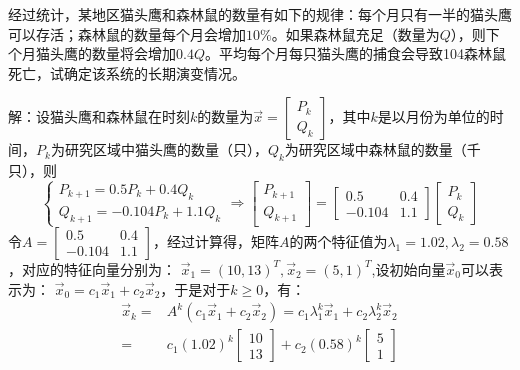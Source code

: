 \begin{eg}
经过统计，某地区猫头鹰和森林鼠的数量有如下的规律：每个月只有一半的猫头鹰可以存活；森林鼠的数量每个月会增加$10\%$。如果森林鼠充足（数量为$Q$），则下个月猫头鹰的数量将会增加$0.4Q$。平均每个月每只猫头鹰的捕食会导致104森林鼠死亡，试确定该系统的长期演变情况。
\end{eg}
解：设猫头鹰和森林鼠在时刻$k$的数量为$\vec{x}=\begin{bmatrix}P_k\\Q_k\end{bmatrix}$，其中$k$是以月份为单位的时间，$P_k$为研究区域中猫头鹰的数量（只），$Q_k$为研究区域中森林鼠的数量（千只），则
\begin{equation*}
\begin{cases}
P_{k+1}=0.5P_{k}+0.4Q_k\\
Q_{k+1}=-0.104P_k+1.1Q_k
\end{cases}
\Rightarrow
\begin{bmatrix}P_{k+1}\\Q_{k+1}\end{bmatrix}=
\begin{bmatrix}0.5&0.4\\-0.104&1.1\end{bmatrix}
\begin{bmatrix}P_k\\Q_k\end{bmatrix}
\end{equation*}
令$A=\begin{bmatrix}0.5&0.4\\-0.104&1.1\end{bmatrix}$，经过计算得，矩阵$A$的两个特征值为$\lambda_1=1.02,\lambda_2=0.58$，对应的特征向量分别为：
$\vec{x}_1=(10,13)^T,\vec{x}_2=(5,1)^T$,设初始向量$\vec{x}_0$可以表示为：
$\vec{x}_0=c_1\vec{x}_1+c_2\vec{x}_2$，于是对于$k\geq0$，有：
\begin{align*}
\vec{x}_k=&A^k(c_1\vec{x}_1+c_2\vec{x}_2)=c_1\lambda_1^k\vec{x}_1+c_2\lambda_2^k\vec{x}_2\\
=&c_1(1.02)^k\begin{bmatrix}10\\13\end{bmatrix}+c_2(0.58)^k\begin{bmatrix}5\\1\end{bmatrix}
\end{align*}


